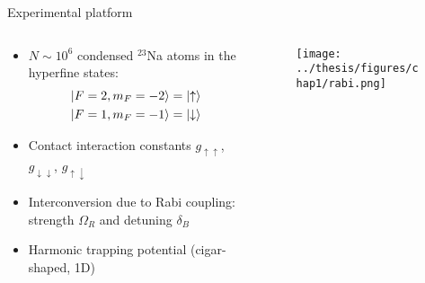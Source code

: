 \documentclass[aspectratio=169]{beamer}
\begin{document}


\begin{frame}{Experimental platform}
  \begin{columns}
    \begin{column}{0.5\textwidth}
      \begin{itemize}
        \item $N\sim10^6$ condensed $^{23}$Na atoms in the hyperfine states: 
        \begin{align*}
          &\ket{F = 2, m_F = -2} = \ket{\uparrow} \\
          &\ket{F = 1, m_F = -1} = \ket{\downarrow}
        \end{align*}
        \item Contact interaction constants $g_{\uparrow\uparrow}$, $g_{\downarrow\downarrow}$, $g_{\uparrow\downarrow}$
        \item Interconversion due to Rabi coupling: strength $\Omega_R$ and detuning $\delta_B$
        \item Harmonic trapping potential (cigar-shaped, 1D)
      \end{itemize}
    \end{column}
    \begin{column}{0.5\textwidth}
      \begin{figure}
        \centering
        \texttt{[image: ../thesis/figures/chap1/rabi.png]}
      \end{figure}
    \end{column}
  \end{columns}
\end{frame}
\end{document}

